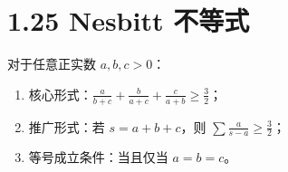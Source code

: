 \documentclass{article}
\begin{document}
\section*{1.25 Nesbitt 不等式}
对于任意正实数 \( a,b,c>0 \)：
\begin{enumerate}
    \item 核心形式：\( \frac{a}{b+c}+\frac{b}{a+c}+\frac{c}{a+b} \geq \frac{3}{2} \)；
    \item 推广形式：若 \( s=a+b+c \)，则 \( \sum \frac{a}{s-a} \geq \frac{3}{2} \)；
    \item 等号成立条件：当且仅当 \( a=b=c \)。
\end{enumerate}
\end{document}
